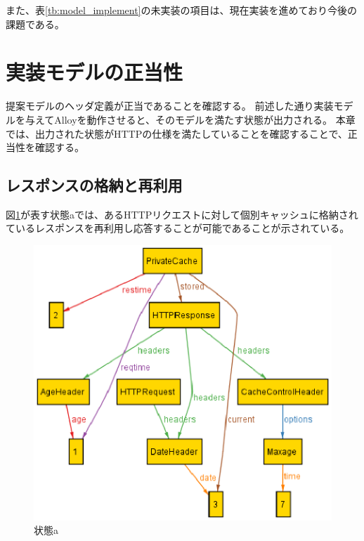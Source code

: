 \documentclass{css}
\begin{document}
また、表\ref{tb:model_implement}の未実装の項目は、現在実装を進めており今後の課題である。


\section{実装モデルの正当性}
提案モデルのヘッダ定義が正当であることを確認する。
前述した通り実装モデルを与えてAlloyを動作させると、そのモデルを満たす状態が出力される。
本章では、出力された状態がHTTPの仕様を満たしていることを確認することで、正当性を確認する。

\subsection{レスポンスの格納と再利用}
図\ref{fig:case1}が表す状態aでは、あるHTTPリクエストに対して個別キャッシュに格納されているレスポンスを再利用し応答することが可能であることが示されている。

\begin{figure}[htb]
\centering
\includegraphics[width=1.0\hsize]{case1.eps}
\caption{状態a}
\label{fig:case1}
\end{figure}
\end{document}
